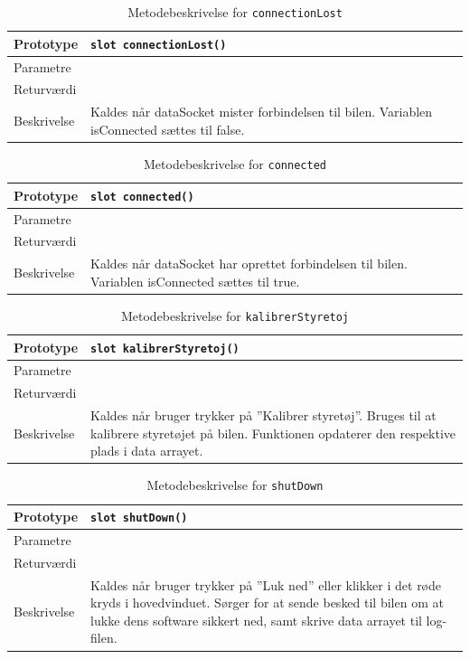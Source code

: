 \begin{table}[H]
\begin{tabularx}{\textwidth}{| L{2.5 cm} | Z |} \hline
Prototype & \texttt{slot connectionLost()} \\\hline
Parametre &   \\\hline
Returværdi &  \\\hline
Beskrivelse & Kaldes når dataSocket mister forbindelsen til bilen. Variablen isConnected sættes til false. \\\hline
\end{tabularx}
\caption{Metodebeskrivelse for \texttt{connectionLost}}
\label{table:met_connectionLost}
\end{table}

\begin{table}[H]
\begin{tabularx}{\textwidth}{| L{2.5 cm} | Z |} \hline
Prototype & \texttt{slot connected()} \\\hline
Parametre &   \\\hline
Returværdi &  \\\hline
Beskrivelse & Kaldes når dataSocket har oprettet forbindelsen til bilen. Variablen isConnected sættes til true. \\\hline
\end{tabularx}
\caption{Metodebeskrivelse for \texttt{connected}}
\label{table:met_connected}
\end{table}


\begin{table}[H]
\begin{tabularx}{\textwidth}{| L{2.5 cm} | Z |} \hline
Prototype & \texttt{slot kalibrerStyretoj()} \\\hline
Parametre &   \\\hline
Returværdi &  \\\hline
Beskrivelse & Kaldes når bruger trykker på ''Kalibrer styretøj''. Bruges til at kalibrere styretøjet på bilen. Funktionen opdaterer den respektive plads i data arrayet. \\\hline
\end{tabularx}
\caption{Metodebeskrivelse for \texttt{kalibrerStyretoj}}
\label{table:met_kalibrerStyretoj}
\end{table}

\begin{table}[H]
\begin{tabularx}{\textwidth}{| L{2.5 cm} | Z |} \hline
Prototype & \texttt{slot shutDown()} \\\hline
Parametre &   \\\hline
Returværdi &  \\\hline
Beskrivelse & Kaldes når bruger trykker på ''Luk ned'' eller klikker i det røde kryds i hovedvinduet. Sørger for at sende besked til bilen om at lukke dens software sikkert ned, samt skrive data arrayet til log-filen.  \\\hline
\end{tabularx}
\caption{Metodebeskrivelse for \texttt{shutDown}}
\label{table:met_shutDown}
\end{table}

